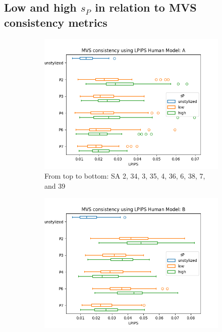 \subsection{Low and high $s_P$ in relation to MVS consistency metrics}

\begin{figure}[ht]
	\centering
	\begin{subfigure}{0.49\textwidth}
		\includegraphics[width=\linewidth]{Figures/results/good/lpips_dora.png}
		\caption{From top to bottom: SA 2, 34, 3, 35, 4, 36, 6, 38, 7, and 39}
	\end{subfigure}
	\begin{subfigure}{0.49\textwidth}
		\includegraphics[width=\linewidth]{Figures/results/good/lpips_ephra.png}

\end{subfigure}
\end{figure}
